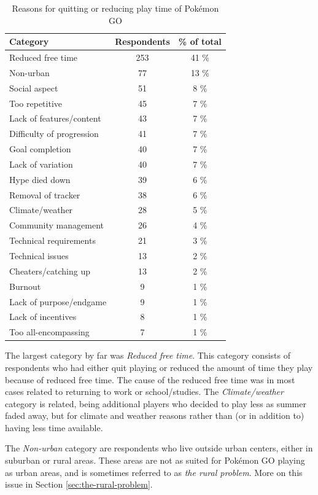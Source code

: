 \begin{table}[h]
	\centering
	\caption{Reasons for quitting or reducing play time of Pokémon GO}
	\label{tbl:reasons-for-quitting}
	\begin{tabular}{|l|c|c|}
		\hline
		\textbf{Category} & \textbf{Respondents} & \textbf{\% of total}\\
		\hline\hline
		Reduced free time & 253 & 41 \%\\\hline
		Non-urban & 77 & 13 \%\\\hline
		Social aspect & 51 & 8 \%\\\hline
		Too repetitive & 45 & 7 \%\\\hline
		Lack of features/content & 43 & 7 \%\\\hline
		Difficulty of progression & 41 & 7 \%\\\hline
		Goal completion & 40 & 7 \%\\\hline
		Lack of variation & 40 & 7 \%\\\hline
		Hype died down & 39 & 6 \%\\\hline
		Removal of tracker & 38 & 6 \%\\\hline
		Climate/weather & 28 & 5 \%\\\hline
		Community management & 26 & 4 \%\\\hline
		Technical requirements & 21 & 3 \%\\\hline
		Technical issues & 13 & 2 \%\\\hline
		Cheaters/catching up & 13 & 2 \%\\\hline
		Burnout & 9 & 1 \%\\\hline
		Lack of purpose/endgame & 9 & 1 \%\\\hline
		Lack of incentives & 8 & 1 \%\\\hline
		Too all-encompassing & 7 & 1 \%\\\hline
	\end{tabular}
\end{table}

The largest category by far was \emph{Reduced free time}. This category consists of respondents who had either quit playing or reduced the amount of time they play because of reduced free time. The cause of the reduced free time was in most cases related to returning to work or school/studies. The \emph{Climate/weather} category is related, being additional players who decided to play less as summer faded away, but for climate and weather reasons rather than (or in addition to) having less time available.

The \emph{Non-urban} category are respondents who live outside urban centers, either in suburban or rural areas. These areas are not as suited for Pokémon GO playing as urban areas, and is sometimes referred to as \emph{the rural problem}. More on this issue in Section \ref{sec:the-rural-problem}.

